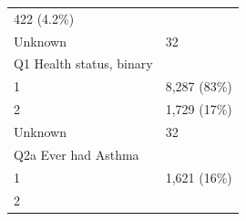 \documentclass[]{article}
\begin{document}
\begin{longtable}[]{@{}ll@{}}
\begin{minipage}[t]{0.23\columnwidth}
422 (4.2\%)\strut
\end{minipage}\tabularnewline
\begin{minipage}[t]{0.71\columnwidth}\raggedright
Unknown\strut
\end{minipage} & \begin{minipage}[t]{0.23\columnwidth}\raggedright
32\strut
\end{minipage}\tabularnewline
\begin{minipage}[t]{0.71\columnwidth}\raggedright
Q1 Health status, binary\strut
\end{minipage} & \begin{minipage}[t]{0.23\columnwidth}\raggedright
\strut
\end{minipage}\tabularnewline
\begin{minipage}[t]{0.71\columnwidth}\raggedright
1\strut
\end{minipage} & \begin{minipage}[t]{0.23\columnwidth}\raggedright
8,287 (83\%)\strut
\end{minipage}\tabularnewline
\begin{minipage}[t]{0.71\columnwidth}\raggedright
2\strut
\end{minipage} & \begin{minipage}[t]{0.23\columnwidth}\raggedright
1,729 (17\%)\strut
\end{minipage}\tabularnewline
\begin{minipage}[t]{0.71\columnwidth}\raggedright
Unknown\strut
\end{minipage} & \begin{minipage}[t]{0.23\columnwidth}\raggedright
32\strut
\end{minipage}\tabularnewline
\begin{minipage}[t]{0.71\columnwidth}\raggedright
Q2a Ever had Asthma\strut
\end{minipage} & \begin{minipage}[t]{0.23\columnwidth}\raggedright
\strut
\end{minipage}\tabularnewline
\begin{minipage}[t]{0.71\columnwidth}\raggedright
1\strut
\end{minipage} & \begin{minipage}[t]{0.23\columnwidth}\raggedright
1,621 (16\%)\strut
\end{minipage}\tabularnewline
\begin{minipage}[t]{0.71\columnwidth}\raggedright
2\strut
\end{minipage} & \begin{minipage}[t]{0.23\columnwidth}\raggedright

\end{minipage}
\end{longtable}
\end{document}
